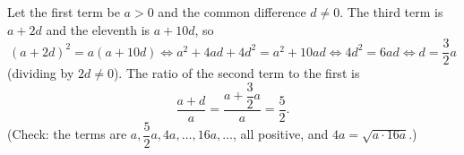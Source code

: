 Let the first term be $a>0$ and the common difference $d\ne0$. The third term is $a+2d$ and the eleventh is $a+10d$, so
\[(a+2d)^2=a(a+10d)\iff a^2+4ad+4d^2=a^2+10ad\iff 4d^2=6ad\iff d=\dfrac32a\]
(dividing by $2d\ne0$). The ratio of the second term to the first is
\[\dfrac{a+d}{a}=\dfrac{a+\dfrac32a}{a}=\boxed{\dfrac52}.\]
(Check: the terms are $a,\dfrac52a,4a,\dots,16a,\dots$, all positive, and $4a=\sqrt{a\cdot16a}$.)
